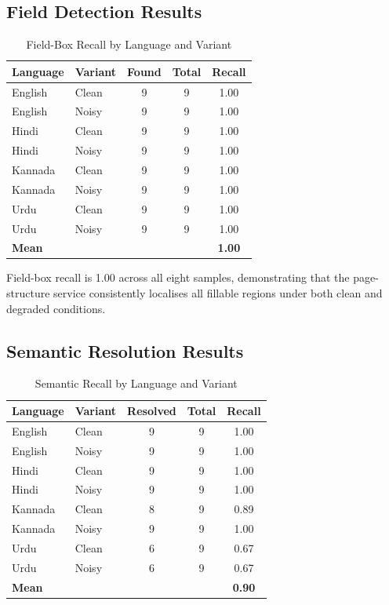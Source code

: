 \documentclass[conference]{IEEEtran}
\begin{document}
\subsection{Field Detection Results}

\begin{table}[htbp]
\caption{Field-Box Recall by Language and Variant}
\label{tab:detection}
\centering
\small
\begin{tabular}{@{}llccc@{}}
\toprule
\textbf{Language} & \textbf{Variant} & \textbf{Found} & \textbf{Total} & \textbf{Recall} \\
\midrule
English  & Clean & 9 & 9 & 1.00 \\
English  & Noisy & 9 & 9 & 1.00 \\
Hindi    & Clean & 9 & 9 & 1.00 \\
Hindi    & Noisy & 9 & 9 & 1.00 \\
Kannada  & Clean & 9 & 9 & 1.00 \\
Kannada  & Noisy & 9 & 9 & 1.00 \\
Urdu     & Clean & 9 & 9 & 1.00 \\
Urdu     & Noisy & 9 & 9 & 1.00 \\
\midrule
\multicolumn{3}{l}{\textbf{Mean}} & & \textbf{1.00} \\
\bottomrule
\end{tabular}
\end{table}

Field-box recall is 1.00 across all eight samples, demonstrating that the page-structure service consistently localises all fillable regions under both clean and degraded conditions.

\subsection{Semantic Resolution Results}

\begin{table}[htbp]
\caption{Semantic Recall by Language and Variant}
\label{tab:semantic}
\centering
\small
\begin{tabular}{@{}llccc@{}}
\toprule
\textbf{Language} & \textbf{Variant} & \textbf{Resolved} & \textbf{Total} & \textbf{Recall} \\
\midrule
English  & Clean & 9 & 9 & 1.00 \\
English  & Noisy & 9 & 9 & 1.00 \\
Hindi    & Clean & 9 & 9 & 1.00 \\
Hindi    & Noisy & 9 & 9 & 1.00 \\
Kannada  & Clean & 8 & 9 & 0.89 \\
Kannada  & Noisy & 9 & 9 & 1.00 \\
Urdu     & Clean & 6 & 9 & 0.67 \\
Urdu     & Noisy & 6 & 9 & 0.67 \\
\midrule
\multicolumn{3}{l}{\textbf{Mean}} & & \textbf{0.90} \\
\bottomrule
\end{tabular}
\end{table}
\end{document}
